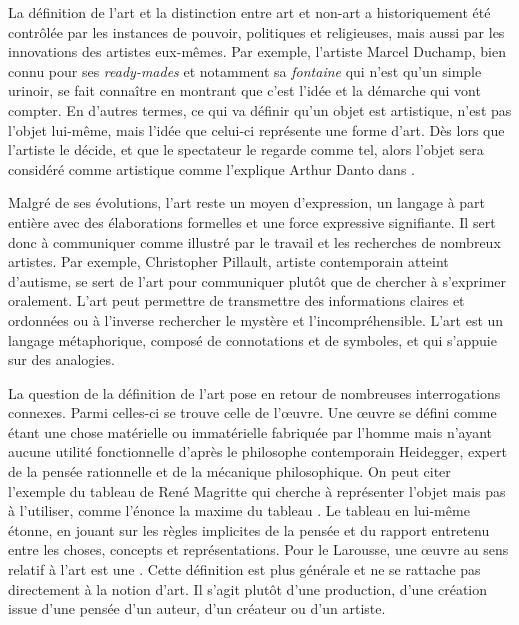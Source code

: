 \documentclass[12pt]{article} %
\begin{document}
La définition de l'art et la distinction entre art et non-art a historiquement été contrôlée par les instances de pouvoir, politiques et religieuses, mais aussi par les innovations des artistes eux-mêmes. Par exemple, l'artiste Marcel Duchamp, bien connu pour ses \textit{ready-mades} et notamment sa \textit{fontaine} qui n'est qu'un simple urinoir, se fait connaître en montrant que c'est l'idée et la démarche qui vont compter. En d'autres termes, ce qui va définir qu'un objet est artistique, n'est pas l'objet lui-même, mais l'idée que celui-ci représente une forme d'art. Dès lors que l'artiste le décide, et que le spectateur le regarde comme tel, alors l'objet sera considéré comme artistique comme l'explique Arthur Danto dans  \cite{ADanto1989}. 

Malgré de ses évolutions, l'art reste un moyen d'expression, un langage à part entière avec des élaborations formelles et une force expressive signifiante. Il sert donc à communiquer comme illustré par le travail et les recherches de nombreux artistes. Par exemple, Christopher Pillault, artiste contemporain atteint d'autisme, se sert de l'art pour communiquer plutôt que de chercher à s'exprimer oralement. L'art peut permettre de transmettre des informations claires et ordonnées ou à l'inverse rechercher le mystère et l'incompréhensible. L'art est un langage métaphorique, composé de connotations et de symboles, et qui s'appuie sur des analogies. 

La question de la définition de l'art pose en retour de nombreuses interrogations connexes. Parmi celles-ci se trouve celle de l'œuvre. Une œuvre se défini comme étant une chose matérielle ou immatérielle fabriquée par l'homme mais n'ayant aucune utilité fonctionnelle d'après le philosophe contemporain Heidegger, expert de la pensée rationnelle et de la mécanique philosophique. On peut citer l'exemple du tableau de René Magritte  qui cherche à représenter l'objet mais pas à l'utiliser, comme l'énonce la maxime  du tableau \cite{RMAgritte1929}. Le tableau en lui-même étonne, en jouant sur les règles implicites de la pensée et du rapport entretenu entre les choses, concepts et représentations. Pour le Larousse, une œuvre au sens relatif à l'art est une  \cite{LarousseOnline-oeuvre}. Cette définition est plus générale et ne se rattache pas directement à la notion d'art. Il s'agit plutôt d'une production, d'une création issue d'une pensée d'un auteur, d'un créateur ou d'un artiste.  
\end{document}

